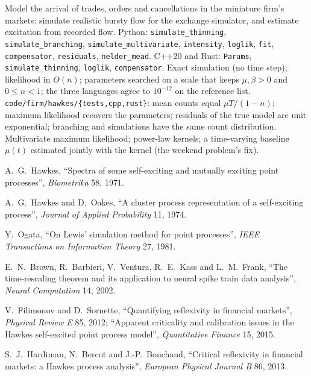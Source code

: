 \begin{build}
 Model the arrival of trades, orders and cancellations in the miniature firm's markets:
simulate realistic bursty flow for the exchange simulator, and estimate excitation from recorded
flow.
 Python: \texttt{simulate\_thinning}, \texttt{simulate\_branching},
\texttt{simulate\_multivariate}, \texttt{intensity}, \texttt{loglik}, \texttt{fit}, \texttt{compensator},
\texttt{residuals}, \texttt{nelder\_mead}. C++20 and Rust: \texttt{Params}, \texttt{simulate\_thinning},
\texttt{loglik}, \texttt{compensator}.
 Exact simulation (no time step); likelihood in $O(n)$; parameters searched on a scale that
keeps $\mu, \beta > 0$ and $0 \le n < 1$; the three languages agree to $10^{-12}$ on the reference list.
 \texttt{code/firm/hawkes/\{tests,cpp,rust\}}: mean counts equal $\mu T/(1 - n)$;
maximum likelihood recovers the parameters; residuals of the true model are unit exponential; branching and
 simulations have the same count distribution.
 Multivariate maximum likelihood; power-law kernels; a time-varying baseline $\mu(t)$ estimated
jointly with the kernel (the weekend problem's fix).
\end{build}

\begin{omsources}
\item A.~G.~Hawkes, ``Spectra of some self-exciting and mutually exciting point processes'',
\emph{Biometrika} 58, 1971.
\item A.~G.~Hawkes and D.~Oakes, ``A cluster process representation of a self-exciting process'',
\emph{Journal of Applied Probability} 11, 1974.
\item Y.~Ogata, ``On Lewis' simulation method for point processes'', \emph{IEEE Transactions on
Information Theory} 27, 1981.
\item E.~N.~Brown, R.~Barbieri, V.~Ventura, R.~E.~Kass and L.~M.~Frank, ``The time-rescaling theorem and
its application to neural spike train data analysis'', \emph{Neural Computation} 14, 2002.
\item V.~Filimonov and D.~Sornette, ``Quantifying reflexivity in financial markets'', \emph{Physical Review E}
85, 2012; ``Apparent criticality and calibration issues in the Hawkes self-excited point process model'',
\emph{Quantitative Finance} 15, 2015.
\item S.~J.~Hardiman, N.~Bercot and J.-P.~Bouchaud, ``Critical reflexivity in financial markets: a Hawkes
process analysis'', \emph{European Physical Journal B} 86, 2013.
\end{omsources}

